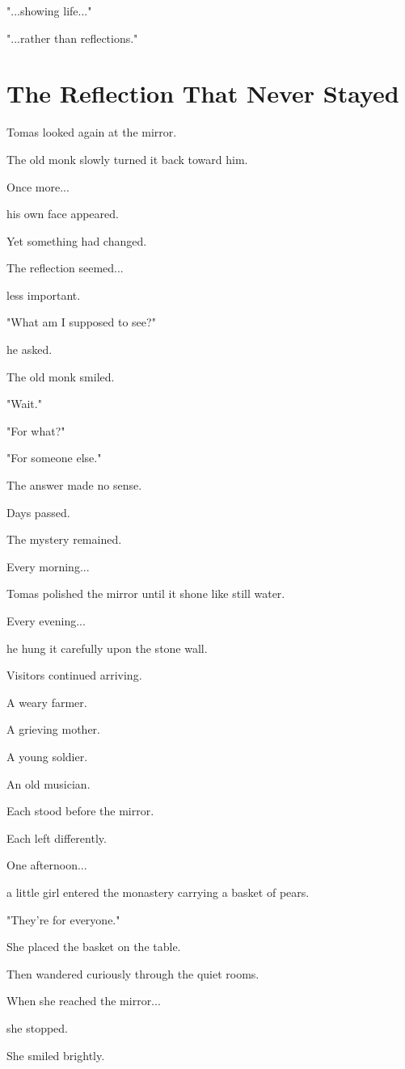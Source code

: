\documentclass[12pt,openany]{book}
\begin{document}
"...showing life..."

"...rather than reflections."
\section*{The Reflection That Never Stayed}

Tomas looked again at the mirror.

The old monk slowly turned it back toward him.

Once more...

his own face appeared.

Yet something had changed.

The reflection seemed...

less important.

"What am I supposed to see?"

he asked.

The old monk smiled.

"Wait."

"For what?"

"For someone else."

The answer made no sense.

Days passed.

The mystery remained.

Every morning...

Tomas polished the mirror until it shone like still water.

Every evening...

he hung it carefully upon the stone wall.

Visitors continued arriving.

A weary farmer.

A grieving mother.

A young soldier.

An old musician.

Each stood before the mirror.

Each left differently.

One afternoon...

a little girl entered the monastery carrying a basket of pears.

"They're for everyone."

She placed the basket on the table.

Then wandered curiously through the quiet rooms.

When she reached the mirror...

she stopped.

She smiled brightly.
\end{document}
